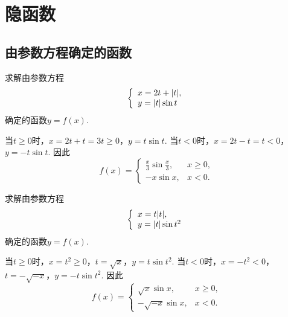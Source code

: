 \section{隐函数}
\subsection{由参数方程确定的函数}
\begin{example}
求解由参数方程\[
	\left\{ \begin{array}{l}
		x = 2t + \abs{t}, \\
		y = \abs{t} \sin t
	\end{array} \right.
\]确定的函数\(y = f(x)\).
\begin{solution}
当\(t\geq0\)时，\(x = 2t + t = 3t \geq 0\)，\(y = t \sin t\).
当\(t<0\)时，\(x = 2t - t = t < 0\)，\(y = -t \sin t\).
因此\[
	f(x) = \left\{ \begin{array}{cl}
		\frac{x}{3} \sin \frac{x}{3}, & x\geq0, \\
		-x \sin x, & x<0.
	\end{array} \right.
\]
\end{solution}
\end{example}
\begin{example}
求解由参数方程\[
	\left\{ \begin{array}{l}
		x = t \abs{t}, \\
		y = \abs{t} \sin t^2
	\end{array} \right.
\]确定的函数\(y = f(x)\).
\begin{solution}
当\(t\geq0\)时，\(x = t^2 \geq 0\)，\(t = \sqrt{x}\)，\(y = t \sin t^2\).
当\(t<0\)时，\(x = -t^2 < 0\)，\(t = -\sqrt{-x}\)，\(y = -t \sin t^2\).
因此\[
	f(x) = \left\{ \begin{array}{cl}
		\sqrt{x} \sin x, & x\geq0, \\
		-\sqrt{-x} \sin x, & x<0.
	\end{array} \right.
\]
\end{solution}
\end{example}
